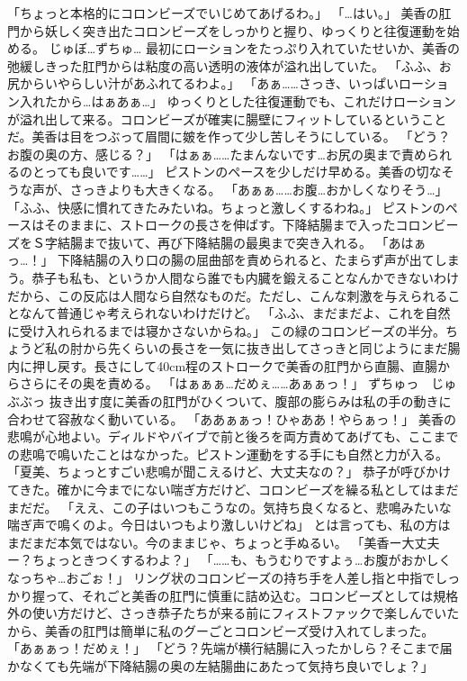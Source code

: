 「ちょっと本格的にコロンビーズでいじめてあげるわ。」
「…はい。」
美香の肛門から妖しく突き出たコロンビーズをしっかりと握り、ゆっくりと往復運動を始める。
じゅぼ…ずちゅ…
最初にローションをたっぷり入れていたせいか、美香の弛緩しきった肛門からは粘度の高い透明の液体が溢れ出していた。
「ふふ、お尻からいやらしい汁があふれてるわよ。」
「あぁ……さっき、いっぱいローション入れたから…はぁあぁ…」
ゆっくりとした往復運動でも、これだけローションが溢れ出して来る。コロンビーズが確実に腸壁にフィットしているということだ。美香は目をつぶって眉間に皴を作って少し苦しそうにしている。
「どう？お腹の奥の方、感じる？」
「はぁぁ……たまんないです…お尻の奥まで責められるのとっても良いです……」
ピストンのペースを少しだけ早める。美香の切なそうな声が、さっきよりも大きくなる。
「あぁぁ……お腹…おかしくなりそう…」
「ふふ、快感に慣れてきたみたいね。ちょっと激しくするわね。」
ピストンのペースはそのままに、ストロークの長さを伸ばす。下降結腸まで入ったコロンビーズをＳ字結腸まで抜いて、再び下降結腸の最奥まで突き入れる。
「あはぁっ…！」
下降結腸の入り口の腸の屈曲部を責められると、たまらず声が出てしまう。恭子も私も、というか人間なら誰でも内臓を鍛えることなんかできないわけだから、この反応は人間なら自然なものだ。ただし、こんな刺激を与えられることなんて普通じゃ考えられないわけだけど。
「ふふ、まだまだよ、これを自然に受け入れられるまでは寝かさないからね。」
この緑のコロンビーズの半分。ちょうど私の肘から先くらいの長さを一気に抜き出してさっきと同じようにまだ腸内に押し戻す。長さにして40cm程のストロークで美香の肛門から直腸、直腸からさらにその奥を責める。
「はぁぁぁ…だめぇ……あぁぁっ！」
ずちゅっ　じゅぶぶっ
抜き出す度に美香の肛門がひくついて、腹部の膨らみは私の手の動きに合わせて容赦なく動いている。
「ああぁぁっ！ひゃああ！やらぁっ！」
美香の悲鳴が心地よい。ディルドやバイブで前と後ろを両方責めてあげても、ここまでの悲鳴で鳴いたことはなかった。ピストン運動をする手にも自然と力が入る。
「夏美、ちょっとすごい悲鳴が聞こえるけど、大丈夫なの？」
恭子が呼びかけてきた。確かに今までにない喘ぎ方だけど、コロンビーズを繰る私としてはまだまだだ。
「ええ、この子はいつもこうなの。気持ち良くなると、悲鳴みたいな喘ぎ声で鳴くのよ。今日はいつもより激しいけどね」
とは言っても、私の方はまだまだ本気ではない。今のままじゃ、ちょっと手ぬるい。
「美香ー大丈夫ー？ちょっときつくするわよ？」
「……も、もうむりですよぅ…お腹がおかしくなっちゃ…おごぉ！」
リング状のコロンビーズの持ち手を人差し指と中指でしっかり握って、それごと美香の肛門に慎重に詰め込む。コロンビーズとしては規格外の使い方だけど、さっき恭子たちが来る前にフィストファックで楽しんでいたから、美香の肛門は簡単に私のグーごとコロンビーズ受け入れてしまった。
「あぁぁっ！だめぇ！」
「どう？先端が横行結腸に入ったかしら？そこまで届かなくても先端が下降結腸の奥の左結腸曲にあたって気持ち良いでしょ？」

